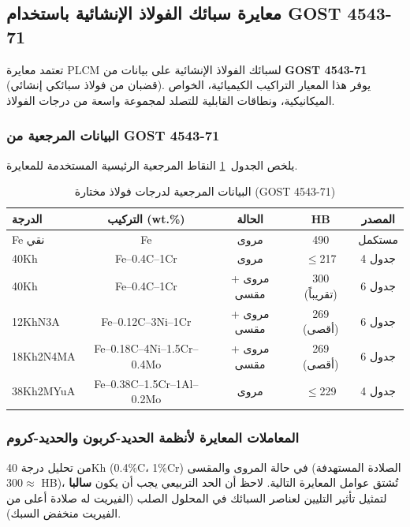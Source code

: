 \documentclass[12pt,a4paper]{article}
\begin{document}
	\subsection{معايرة سبائك الفولاذ الإنشائية باستخدام GOST 4543-71}
	\label{subsec:steel_calibration_gost4543}
	
	تعتمد معايرة PLCM لسبائك الفولاذ الإنشائية على بيانات من \textbf{GOST 4543-71} (قضبان من فولاذ سبائكي إنشائي). يوفر هذا المعيار التراكيب الكيميائية، الخواص الميكانيكية، ونطاقات القابلية للتصلد لمجموعة واسعة من درجات الفولاذ.
	
	\subsubsection{البيانات المرجعية من GOST 4543-71}
	
	يلخص الجدول~\ref{tab:steel_gost4543} النقاط المرجعية الرئيسية المستخدمة للمعايرة.
	
	\begin{table}[htbp]
		\centering
		\caption{البيانات المرجعية لدرجات فولاذ مختارة (GOST 4543-71)}
		\label{tab:steel_gost4543}
		\begin{tabular}{lcccc}
			\toprule
			\textbf{الدرجة} & \textbf{التركيب (wt.\%)} & \textbf{الحالة} & \textbf{HB} & \textbf{المصدر} \\
			\midrule
			Fe نقي & Fe & مروى & 490 & مستكمل \\
			40Kh & Fe–0.4C–1Cr & مروى & \(\le\)217 & جدول 4 \\
			40Kh & Fe–0.4C–1Cr & مروى + مقسى & 300 (تقريباً) & جدول 6 \\
			12KhN3A & Fe–0.12C–3Ni–1Cr & مروى + مقسى & 269 (أقصى) & جدول 6 \\
			18Kh2N4MA & Fe–0.18C–4Ni–1.5Cr–0.4Mo & مروى + مقسى & 269 (أقصى) & جدول 6 \\
			38Kh2MYuA & Fe–0.38C–1.5Cr–1Al–0.2Mo & مروى & \(\le\)229 & جدول 4 \\
			\bottomrule
		\end{tabular}
	\end{table}
	
	\subsubsection{المعاملات المعايرة لأنظمة الحديد-كربون والحديد-كروم}
	
	من تحليل درجة 40Kh (0.4\%C، 1\%Cr) في حالة المروى والمقسى (الصلادة المستهدفة \(\approx\)300 HB)، تُشتق عوامل المعايرة التالية. لاحظ أن الحد التربيعي يجب أن يكون \textbf{سالبا} لتمثيل تأثير التليين لعناصر السبائك في المحلول الصلب (الفيريت له صلادة أعلى من الفيريت منخفض السبك).
	
\end{document}
